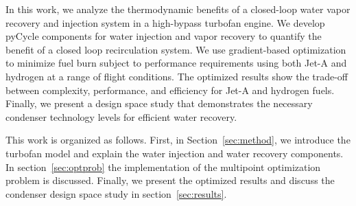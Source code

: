 \documentclass[conf]{new-aiaa}
\begin{document}
In this work, we analyze the thermodynamic benefits of a closed-loop water vapor recovery and injection system in a high-bypass turbofan engine.
We develop pyCycle components for water injection and vapor recovery to quantify the benefit of a closed loop recirculation system.
We use gradient-based optimization to minimize fuel burn subject to performance requirements using both Jet-A and hydrogen at a range of flight conditions.
The optimized results show the trade-off between complexity, performance, and efficiency for Jet-A and hydrogen fuels.
Finally, we present a design space study that demonstrates the necessary condenser technology levels for efficient water recovery.

This work is organized as follows. First, in Section~\ref{sec:method}, we introduce the turbofan model and explain the water injection and water recovery components.
In section~\ref{sec:optprob} the implementation of the multipoint optimization problem is discussed.
Finally, we present the optimized results and discuss the condenser design space study in section~\ref{sec:results}.
\end{document}

